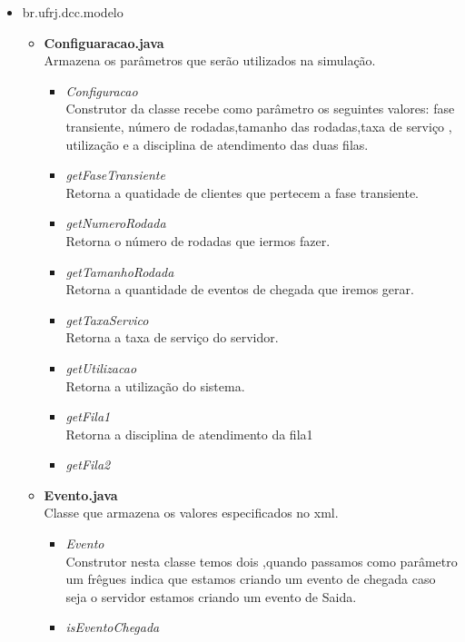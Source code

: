 \documentclass[a4paper,10pt]{article}
\begin{document}
\begin{itemize}
\begin{itemize}
\begin{itemize}
		    \end{itemize}
	     \end{itemize}
	\item br.ufrj.dcc.modelo
	   \begin{itemize}
	      \item \textbf{Configuaracao.java\\}
		    Armazena os parâmetros que serão utilizados na simulação.
		    \begin{itemize}
			 \item  \textit{Configuracao\\}
			 Construtor da classe recebe como parâmetro os seguintes valores: fase transiente, número  de rodadas,tamanho das rodadas,taxa de serviço , utilização e a disciplina de atendimento
			 das duas filas.
			 \item  \textit{getFaseTransiente\\}
			  Retorna a quatidade de clientes que pertecem a fase transiente.
			 \item  \textit{getNumeroRodada\\}
			  Retorna o número de rodadas que iermos fazer.
			 \item  \textit{getTamanhoRodada\\}
			  Retorna a quantidade de eventos de chegada que iremos gerar.
			 \item  \textit{getTaxaServico\\}
			  Retorna a taxa de serviço do servidor.
			 \item  \textit{getUtilizacao\\}
			  Retorna a utilização do sistema.
			 \item  \textit{getFila1\\}
 			  Retorna a disciplina de atendimento da fila1
			 \item  \textit{getFila2\\}
		    \end{itemize}
	      \item \textbf{Evento.java\\}
		     Classe que armazena os valores especificados no xml.
		    \begin{itemize}
			 \item  \textit{Evento\\}
			  Construtor nesta classe temos dois ,quando passamos como parâmetro um frêgues indica que estamos criando um  evento de chegada caso seja o servidor estamos criando um evento de Saida. 
			 \item  \textit{isEventoChegada\\}

\end{itemize}
\end{itemize}
\end{itemize}
\end{document}
